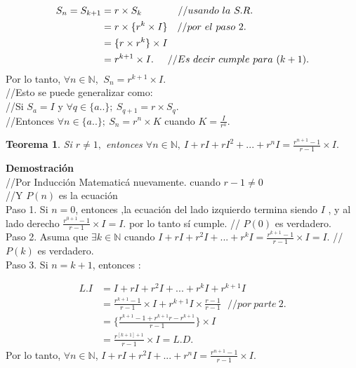 \documentclass[11pt,a4paper]{article}
\newcommand{\ds}{\displaystyle}
\newtheorem{teo}{Teorema}{}
\begin{document}
\begin{align*}
S_{n} = S_{k+1} &= r \times S_{k} ~~~~~~~~~~~//usando~la ~S.R.\\
				&= r \times \{r^{k} \times I\}~~~//por~el~paso~2.\\
				&= \{r \times r^{k}\} \times I\\
				&= r^{k+1} \times I. \hspace{0.5cm} //Es~ decir ~cumple ~para~ (k+1).
\end{align*}
Por lo tanto, $\forall n \in \mathbb{N}$, $~S_{n} = r^{k+1} \times I.$\\
//Esto se puede generalizar como: \\
//Si $S_{a} = I$ y $\forall q \in \{a..\};~ S_{q+1} = r \times S_{q}.$\\
//Entonces $\forall n \in \{a..\};~ S_{n} = r^{n} \times K$ cuando $K= \ds\frac{I}{r^{a}}.$\\

\begin{teo}
Si $r \neq 1,$ entonces $\forall n \in \mathbb{N},~ I + rI + rI^{2}+...+r^{n}I = \ds\frac{r^{n+1}-1}{r-1} \times I.$ 
\end{teo}
\textbf{Demostración}\\
//Por Inducción Matematicá nuevamente. cuando $r-1 \neq 0$\\
//Y $P(n)$ es la ecuación \\

Paso 1. Si $n = 0$, entonces ,la ecuación del lado izquierdo termina siendo $I$ , y al lado derecho $\ds\frac{r^{0+1}-1}{r-1} \times I = I.$ por lo tanto sí cumple. \hspace*{1cm} // $P(0)$ es verdadero.\\
\hspace*{0.5cm} Paso 2. Asuma que $\exists k \in \mathbb{N}$ cuando $I + rI + r^{2}I + ... + r^{k}I = \ds\frac{r^{k+1}-1}{r-1}\times I = I.$ \hspace*{0.01cm} // $P(k)$ es verdadero.\\
\hspace*{0.5cm} Paso 3. Si $n = k + 1$, entonces : 

\begin{align*}
			L.I &= I + rI + r^{2}I + ... +r^{k}I + r^{k+1}I\\
				&=\ds\frac{r^{k+1}-1}{r-1}\times I + r^{k+1}I\times \ds\frac{r-1}{r-1}~~~// por~parte~2.\\
				&= \{\ds\frac{r^{k+1}-1 + r^{k+1}r - r^{k+1}}{r-1}\}\times I\\
				&= \frac{r^{[k+1]+1}}{r-1}\times I = L.D.
\end{align*}
Por lo tanto, $\forall n \in \mathbb{N}$, $I+rI +r^{2}I+...+r^{n}I = \ds\frac{r^{n+1}-1}{r-1}\times I.$\\
\end{document}
